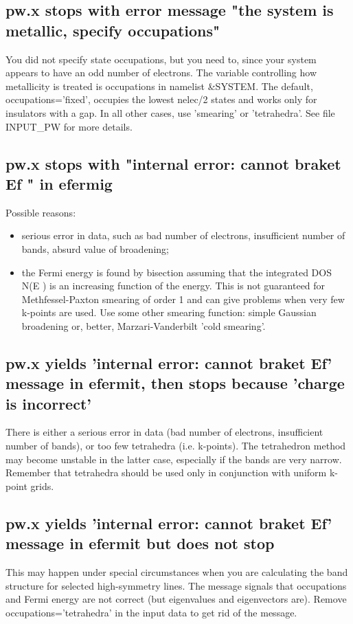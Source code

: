 \documentclass[12pt,a4paper]{article}
\begin{document}
\subsection{pw.x stops with error message "the system is metallic,
  specify occupations"} 
You did not specify state occupations, but you need to, since your
system appears to have an odd number of electrons. The variable
controlling how metallicity is treated is occupations in namelist
\&SYSTEM. The default, occupations='fixed', occupies the lowest
nelec/2 states and works only for insulators with a gap. In all other
cases, use 'smearing' or 'tetrahedra'. See file INPUT\_PW for more details.

\subsection{pw.x stops with "internal error: cannot braket Ef " in efermig}
Possible reasons:
\begin{itemize}
\item serious error in data, such as bad number of electrons,
  insufficient number of bands, absurd value of broadening; 
\item the Fermi energy is found by bisection assuming that the
  integrated DOS N(E ) is an increasing function of the energy. This
  is not guaranteed for Methfessel-Paxton smearing of order 1 and can
  give problems when very few k-points are used. Use some other
  smearing function: simple Gaussian broadening or, better,
  Marzari-Vanderbilt 'cold smearing'. 
\end{itemize}

\subsection{pw.x yields 'internal error: cannot braket Ef' message in
  efermit, then stops because 'charge is incorrect'}  
There is either a serious error in data (bad number of electrons,
insufficient number of bands), or too few tetrahedra
(i.e. k-points). The tetrahedron method may become unstable in the
latter case, especially if the bands are very narrow. Remember that 
tetrahedra should be used only in conjunction with uniform k-point grids.

\subsection{pw.x yields 'internal error: cannot braket Ef' message in
  efermit but does not stop} 
This may happen under special circumstances when you are calculating
the band structure for selected high-symmetry lines. The message
signals that occupations and Fermi energy are not correct (but
eigenvalues and eigenvectors are). Remove occupations='tetrahedra' in
the input data to get rid of the message. 
\end{document}
